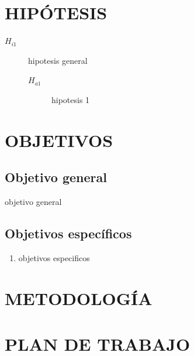 \documentclass[oneside,12pt, letterpaper, titlepage]{book}
\begin{document}
\chapter[HIPÓTESIS]{HIPÓTESIS}
\label{chapter:hipotesis}

\begin{description}
    \item[$H_{i1}$] hipotesis general
    \begin{description}
        \item[$H_{a1}$] hipotesis 1

    \end{description}
\end{description}


\chapter[OBJETIVOS]{OBJETIVOS}
\label{chapter:objetivos}
\section{Objetivo general}
objetivo general
\section{Objetivos específicos}
\begin{enumerate}
\item objetivos especificos
\end{enumerate}


\chapter[METODOLOGÍA]{METODOLOGÍA}
\label{chapter:metodologia}




\chapter[PLAN DE TRABAJO]{PLAN DE TRABAJO}
\label{chapter:plan}
\end{document}
